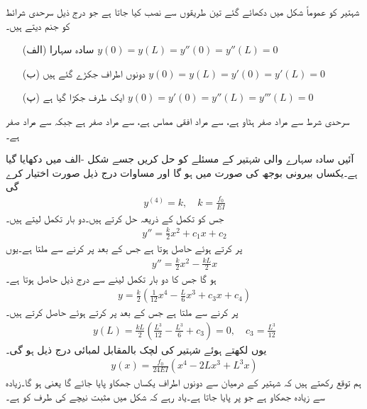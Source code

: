شہتیر کو عموماً شکل  میں دکھائے گئے تین طریقوں سے  نصب کیا جاتا ہے جو درج ذیل سرحدی شرائط کو جنم دیتے ہیں۔
\begin{itemize}
\item[(الف)]\quad سادہ سہارا \quad
$y(0)=y(L)=y''(0)=y''(L)=0$
\item[(ب)]\quad دونوں اطراف جکڑے گئے ہیں \quad 
$y(0)=y(L)=y'(0)=y'(L)=0$
\item[(پ)]\quad ایک طرف جکڑا گیا ہے \quad
$y(0)=y'(0)=y''(L)=y'''(L)=0$
\end{itemize}
سرحدی  شرط  سے مراد صفر ہٹاو ہے،  سے مراد افقی مماس ہے،  سے مراد صفر   ہے جبکہ  سے مراد صفر  ہے۔

آئیں سادہ سہارے والی شہتیر کے مسئلے کو حل کریں جسے شکل -الف میں دکھایا گیا ہے۔یکساں بیرونی بوجھ کی صورت میں  ہو گا اور مساوات  درج ذیل صورت اختیار کرے گی
\begin{align}
y^{(4)}=k, \quad k=\frac{f_0}{EI}
\end{align}
جس کو تکمل کے ذریعہ حل کرتے ہیں۔دو بار تکمل لیتے ہیں۔
\begin{align*}
y''=\frac{k}{2}x^2+c_1x+c_2
\end{align*}
 پر کرتے ہوئے  حاصل ہوتا ہے جس کے بعد   پر کرنے سے  ملتا ہے۔یوں
\begin{align*}
y''=\frac{k}{2}x^2-\frac{kL}{2}x
\end{align*}
ہو گا جس کا دو بار تکمل لینے سے درج ذیل حاصل ہوتا ہے۔
\begin{align*}
y=\frac{k}{2}\left(\frac{1}{12}x^4-\frac{L}{6}x^3+c_3x+c_4\right)
\end{align*}
 پر کرنے سے  ملتا ہے جس کے بعد  پر کرتے ہوئے  حاصل کرتے ہیں۔
\begin{align*}
y(L)=\frac{kL}{2}\left(\frac{L^3}{12}-\frac{L^3}{6}+c_3\right)=0, \quad c_3=\frac{L^3}{12}
\end{align*}
یوں  لکھتے ہوئے شہتیر کی لچک بالمقابل لمبائی درج ذیل ہو گی۔
\begin{align*}
y(x)=\frac{f_0}{24EI}(x^4-2Lx^3+L^3x)
\end{align*}
ہم توقع رکھتے ہیں کہ شہتیر کے درمیان سے دونوں اطراف یکساں جھکاو پایا جائے گا یعنی  ہو گا۔زیادہ سے زیادہ جھکاو  ہے جو  پر پایا جاتا ہے۔یاد رہے کہ شکل  میں مثبت  نیچے کی طرف کو ہے۔

